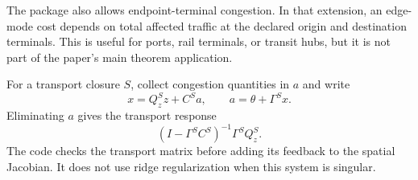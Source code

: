 The package also allows endpoint-terminal congestion. In that extension, an
edge-mode cost depends on total affected traffic at the declared origin and
destination terminals. This is useful for ports, rail terminals, or transit
hubs, but it is not part of the paper's main theorem application.

For a transport closure \(S\), collect congestion quantities in \(a\) and
write
\[
 x=Q_z^S z+C^S a,\qquad
 a=\theta+\Gamma^Sx.
\]
Eliminating \(a\) gives the transport response
\[
 (I-\Gamma^SC^S)^{-1}\Gamma^SQ_z^S.
\]
The code checks the transport matrix before adding its feedback to the spatial
Jacobian. It does not use ridge regularization when this system is singular.

